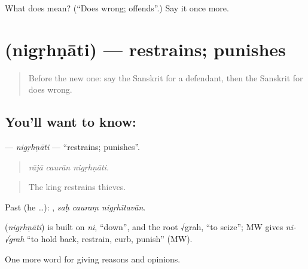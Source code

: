 \begin{tcolorbox}[breakable,colback=teal!4,colframe=teal!35!black,title={Before you move on}]
What does  mean? (\textquotedblleft{}Does wrong; offends\textquotedblright{}.) Say it once more.
\end{tcolorbox}
\section[\texorpdfstring{\sk{निगृह्णाति} (nigṛhṇāti)}{निगृह्णाति (nigṛhṇāti)}]{ (nigṛhṇāti) — restrains; punishes}

\label{lesson:SA-C349-nigrhnati}



\begin{quote}
Before the new one: say the Sanskrit for a defendant, then the Sanskrit for does wrong.
\end{quote}

\subsection*{You'll want to know: }
\textbf{} — \emph{nigṛhṇāti} — \textquotedblleft{}restrains; punishes\textquotedblright{}.

\begin{quote}
  
\end{quote}

\begin{quote}
\emph{rājā caurān nigṛhṇāti.}
\end{quote}

\begin{quote}
The king restrains thieves.
\end{quote}

Past (he …):   , \emph{saḥ cauraṃ nigṛhītavān}.

\begin{cousinweb}
\textbf{} (\emph{nigṛhṇāti}) is built on \emph{ni}, \textquotedblleft{}down\textquotedblright{}, and the root √grah, \textquotedblleft{}to seize\textquotedblright{}; MW gives \emph{ni-√grah} \textquotedblleft{}to hold back, restrain, curb, punish\textquotedblright{} (MW).
\end{cousinweb}

\begin{grammarlens}[title={What you've built}]
One more word for giving reasons and opinions.
\end{grammarlens}

